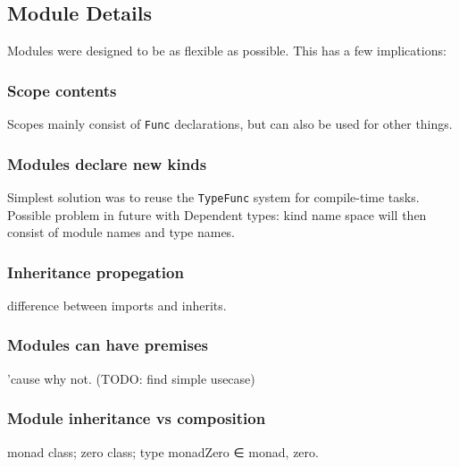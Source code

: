 \subsection{Module Details}
\begin{multicols}{2}\noindent
  Modules were designed to be as flexible as possible.
  This has a few implications:

  \subsubsection*{Scope contents}
  Scopes mainly consist of \texttt{Func} declarations, but can also be used for other things.

  \subsubsection*{Modules declare new kinds}
  Simplest solution was to reuse the \texttt{TypeFunc} system for compile-time tasks.
  Possible problem in future with Dependent types: kind name space will then consist of module names and type names.

  \subsubsection*{Inheritance propegation}
  difference between imports and inherits.

  \subsubsection*{Modules can have premises}
  'cause why not. (TODO: find simple usecase)

  \subsubsection*{Module inheritance vs composition}
  monad class; zero class; type monadZero ∈ monad, zero.

\end{multicols}


